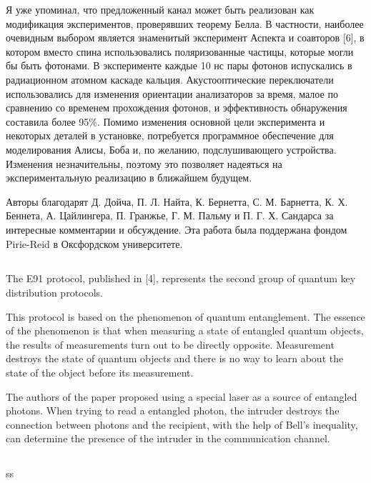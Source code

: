 Я уже упоминал, что предложенный канал может быть реализован как модификация экспериментов, проверявших теорему Белла. В частности, наиболее очевидным выбором является знаменитый эксперимент Аспекта и соавторов [6], в котором вместо спина использовались поляризованные частицы, которые могли бы быть фотонами. В эксперименте каждые 10 нс пары фотонов испускались в радиационном атомном каскаде кальция. Акустооптические переключатели использовались для изменения ориентации анализаторов за время, малое по сравнению со временем прохождения фотонов, и эффективность обнаружения составила более 95\%. Помимо изменения основной цели эксперимента и некоторых деталей в установке, потребуется программное обеспечение для моделирования Алисы, Боба и, по желанию, подслушивающего устройства. Изменения незначительны, поэтому это позволяет надеяться на экспериментальную реализацию в ближайшем будущем.

Авторы благодарят Д. Дойча, П. Л. Найта, К. Бернетта, С. М. Барнетта, К. Х. Беннета, А. Цайлингера, П. Гранжье, Г. М. Пальму и П. Г. Х. Сандарса за интересные комментарии и обсуждение. Эта работа была поддержана фондом Pirie-Reid в Оксфордском университете.


\subsection{\review}
The E91 protocol, published in [4], represents the second group of quantum key distribution protocols.

This protocol is based on the phenomenon of quantum entanglement. The essence of the phenomenon is that when measuring a state of entangled quantum objects, the results of measurements turn out to be directly opposite. Measurement destroys the state of quantum objects and there is no way to learn about the state of the object before its measurement.

The authors of the paper proposed using a special laser as a source of entangled photons. When trying to read a entangled photon, the intruder destroys the connection between photons and the recipient, with the help of Bell's inequality, can determine the presence of the intruder in the communication channel.


\subsection{\dic}
ss